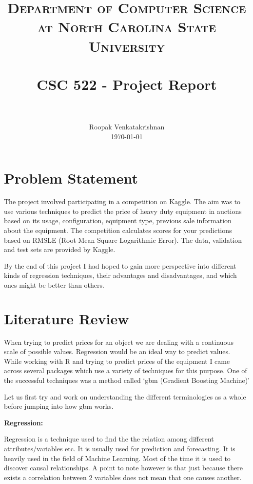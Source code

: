 \documentclass[paper=a4, fontsize=11pt]{scrartcl}	%
\title{
		\usefont{OT1}{bch}{b}{n}
		\normalfont \normalsize \textsc{Department of Computer Science at North Carolina State University} \\ [25pt]
		\horrule{0.5pt} \\[0.4cm]
		\huge CSC 522 - Project Report \\
		\horrule{2pt} \\[0.5cm]
}
\author{
		\normalfont 								\normalsize
        Roopak Venkatakrishnan\\[-3pt]		\normalsize
        \today
}
\date{}
\numberwithin{equation}{section}		%
\numberwithin{figure}{section}			%
\numberwithin{table}{section}				%
\begin{document}
\maketitle
\pagebreak
\section{Problem Statement}
The project involved participating in a competition on Kaggle. The aim was to use various techniques to predict the price of heavy duty equipment in auctions based on its usage, configuration, equipment type, previous sale information about the equipment. The competition calculates scores for your predictions based on RMSLE (Root Mean Square Logarithmic Error). The data, validation and test sets are provided by Kaggle. 

By the end of this project I had hoped to gain more perspective into different kinds of regression techniques, their advantages and disadvantages, and which ones might be better than others.

\pagebreak
\tableofcontents
\pagebreak

\section{Literature Review}

When trying to predict prices for an object we are dealing with a continuous scale of possible values. Regression would be an ideal way to predict values. While working with R and trying to predict prices of the equipment I came across several packages which use a variety of techniques for this purpose. One of the successful techniques was a method called `gbm (Gradient Boosting Machine)'

Let us first try and work on understanding the different terminologies as a whole before jumping into how gbm works.

\begin{minipage}{\textwidth}
\textbf{Regression:}

 Regression is a technique used to find the the relation among different attributes/variables etc. It is usually used for prediction and forecasting. It is heavily used in the field of Machine Learning. Most of the time it is used to discover causal relationships. A point to note however is that just because there exists a correlation between 2 variables does not mean that one causes another.\\
\end{minipage}
\end{document}
